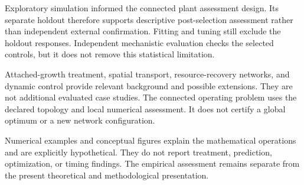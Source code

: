 Exploratory simulation informed the connected plant assessment design. Its separate holdout therefore supports descriptive post-selection assessment rather than independent external confirmation. Fitting and tuning still exclude the holdout responses. Independent mechanistic evaluation checks the selected controls, but it does not remove this statistical limitation.

Attached-growth treatment, spatial transport, resource-recovery networks, and dynamic control provide relevant background and possible extensions. They are not additional evaluated case studies. The connected operating problem uses the declared topology and local numerical assessment. It does not certify a global optimum or a new network configuration.

Numerical examples and conceptual figures explain the mathematical operations and are explicitly hypothetical. They do not report treatment, prediction, optimization, or timing findings. The empirical assessment remains separate from the present theoretical and methodological presentation.
